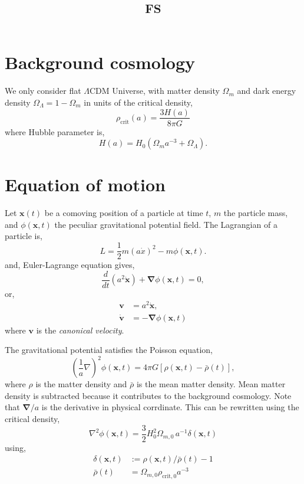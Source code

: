 \documentclass[a4paper]{article}
\title{\textsc{fs}}
\date{}
\begin{document}
\maketitle

\tableofcontents
\clearpage

\section{Background cosmology}

We only consider flat $\Lambda$CDM Universe, with matter density
$\Omega_m$ and dark energy density $\Omega_\Lambda = 1 - \Omega_m$ in units of the critical density,
\begin{equation}
  \rho_\mathrm{crit}(a) = \frac{3H(a)}{8\pi G}
\end{equation}
where Hubble parameter is,
\begin{equation}
  H(a) = H_0 \left( \Omega_m a^{-3} + \Omega_\Lambda \right).
\end{equation}

\section{Equation of motion}
Let $\bm{x}(t)$ be a comoving position of a particle at time $t$, $m$
the particle mass, and $\phi(\bm{x}, t)$ the peculiar gravitational
potential field. The Lagrangian of a particle is,
\begin{equation}
  L= \frac{1}{2} m (a\dot{x})^2 - m \phi(\bm{x}, t).
\end{equation}
and, Euler-Lagrange equation gives,
\begin{equation}
  \label{eq:motion}
  \frac{d}{dt}(a^2 \dot{\bm{x}}) + \bm{\nabla} \phi(\bm{x}, t) = 0,
\end{equation}
or,
\begin{align}
  \bm{v} &= a^2 \dot{\bm{x}},\\
  \dot{\bm{v}} &= - \bm{\nabla} \phi(\bm{x}, t)
\end{align}
where $\bm{v}$ is the \textit{canonical velocity}. 


The gravitational potential satisfies the Poisson equation,
\begin{equation}
  \left( \frac{1}{a} \nabla \right)^2 \phi(\bm{x}, t)
    = 4\pi G \left[ \rho(\bm{x}, t) - \bar{\rho}(t) \right],
\end{equation}
where $\rho$ is the matter density and $\bar{\rho}$ is the mean matter
density. Mean matter density is subtracted because it contributes to the background cosmology. Note that $\bm{\nabla}/a$ is the derivative in physical
corrdinate. This can be rewritten using the critical density,
\begin{equation}
  \label{eq:poisson2}
  \nabla^2 \phi(\bm{x}, t) =
  \frac{3}{2} H_0^2 \Omega_{m,0} \, a^{-1} \delta(\bm{x}, t)
\end{equation}
using,
\begin{align}
  \delta(\bm{x}, t) &:= \rho(\bm{x}, t)/\bar{\rho}(t) - 1 \\
  \bar{\rho}(t)     &= \Omega_{m,0} \rho_{\mathrm{crit},0} a^{-3}
\end{align}
\end{document}
